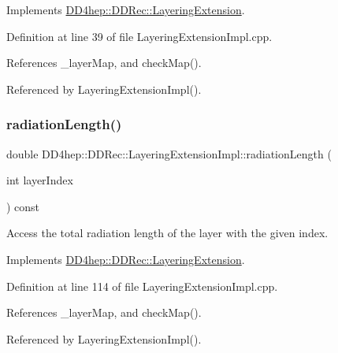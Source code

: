 Implements \hyperlink{class_d_d4hep_1_1_d_d_rec_1_1_layering_extension_a91d00c26112a0456117d1036db335e5d}{D\+D4hep\+::\+D\+D\+Rec\+::\+Layering\+Extension}.



Definition at line 39 of file Layering\+Extension\+Impl.\+cpp.



References \+\_\+layer\+Map, and check\+Map().



Referenced by Layering\+Extension\+Impl().

\hypertarget{class_d_d4hep_1_1_d_d_rec_1_1_layering_extension_impl_ab858ea839a13b9e62499210f928dc031}{}\label{class_d_d4hep_1_1_d_d_rec_1_1_layering_extension_impl_ab858ea839a13b9e62499210f928dc031} 
\subsubsection{\texorpdfstring{radiation\+Length()}{radiationLength()}}
{\footnotesize\ttfamily double D\+D4hep\+::\+D\+D\+Rec\+::\+Layering\+Extension\+Impl\+::radiation\+Length (\begin{DoxyParamCaption}\item[{int}]{layer\+Index }\end{DoxyParamCaption}) const\hspace{0.3cm}{\ttfamily [virtual]}}



Access the total radiation length of the layer with the given index. 



Implements \hyperlink{class_d_d4hep_1_1_d_d_rec_1_1_layering_extension_adf915de4949eb6f0406045b4b38dd469}{D\+D4hep\+::\+D\+D\+Rec\+::\+Layering\+Extension}.



Definition at line 114 of file Layering\+Extension\+Impl.\+cpp.



References \+\_\+layer\+Map, and check\+Map().



Referenced by Layering\+Extension\+Impl().

\hypertarget{class_d_d4hep_1_1_d_d_rec_1_1_layering_extension_impl_ad62fb142713ee5a290b3a7386c3dcd6e}{}\label{class_d_d4hep_1_1_d_d_rec_1_1_layering_extension_impl_ad62fb142713ee5a290b3a7386c3dcd6e} 
